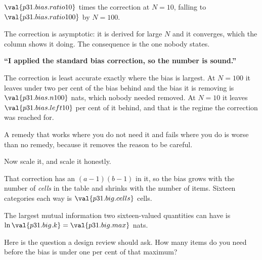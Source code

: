 \begin{fr}

$\val{p31.bias.ratio10}$ times the correction at $N = 10$, falling to
$\val{p31.bias.ratio100}$ by $N = 100$.

The correction is asymptotic: it is derived for large $N$ and it converges,
which the column shows it doing. The consequence is the one nobody states.

\begin{trapbox}
\textbf{\enquote{I applied the standard bias correction, so the number is
sound.}}

The correction is least accurate exactly where the bias is largest. At
$N = 100$ it leaves under two per cent of the bias behind and the bias it is
removing is $\val{p31.bias.n100}$ nats, which nobody needed removed. At
$N = 10$ it leaves $\val{p31.bias.left10}$ per cent of it behind, and that is
the regime the correction was reached for.

A remedy that works where you do not need it and fails where you do is worse
than no remedy, because it removes the reason to be careful.
\end{trapbox}
\end{fr}

\begin{fr}
Now scale it, and scale it honestly.

That correction has an $(a-1)(b-1)$ in it, so the bias grows with the number
of \emph{cells} in the table and shrinks with the number of items. Sixteen
categories each way is $\val{p31.big.cells}$ cells.

The largest mutual information two sixteen-valued quantities can have is
$\ln \val{p31.big.k} = \val{p31.big.max}$ nats.

Here is the question a design review should ask. How many items do you need
before the bias is under one per cent of that maximum?
\dotline
\nextframe
\end{fr}


